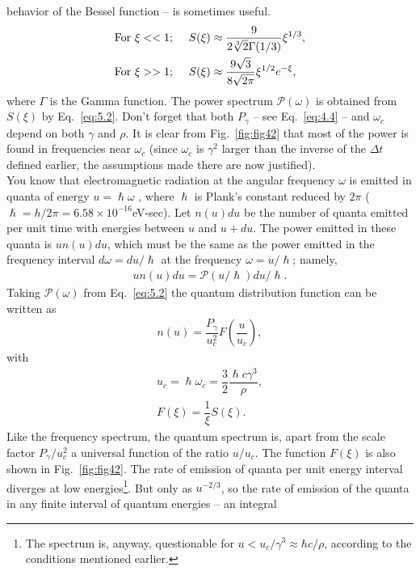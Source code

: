 behavior of the Bessel function -- is sometimes useful.
\begin{align} \label{eq:5.6}
	\text{For }\xi << 1; \hspace{5mm} & S(\xi) \approx \dfrac{9}{2\sqrt[3]{2}\Gamma(1/3)} \xi^{1/3}, \\
    \text{For }\xi >> 1; \hspace{5mm} & S(\xi) \approx \dfrac{9\sqrt{3}}{8 \sqrt{2\pi}} \xi^{1/2} e^{-\xi},
\end{align}
 where $\Gamma$ is the Gamma function. The power spectrum $\mathscr{P}(\omega)$ is obtained from $S(\xi)$ by Eq.~\eqref{eq:5.2}. Don't forget that both $P_\gamma$ -- see Eq.~\eqref{eq:4.4} -- and $\omega_c$ depend on both $\gamma$ and $\rho$. It is clear from Fig.~\ref{fig:fig42} that most of the power is found in frequencies near $\omega_c$ (since $\omega_c$ is $\gamma^2$ larger
 than the inverse of the $\Delta t$ defined earlier, the assumptions made there are now justified).\\
You know that electromagnetic radiation at the angular frequency $\omega$ is emitted in quanta of energy $u = \hslash \omega$ , where $\hslash$ is Plank's constant reduced by $2\pi$ ($\hslash = h/2\pi = 6.58 \times 10^{-16}$eV-sec). Let $n(u)du$ be the number of quanta emitted per unit time with energies between $u$ and $u + du$. The power emitted in these quanta is $un(u)du$,
which must be the same as the power emitted in the frequency interval $d\omega = du/\hslash$
at the frequency $\omega = u/\hslash$; namely,
\begin{align}
	u n(u) du = \mathscr{P}(u/\hslash)du/\hslash.
\end{align}
Taking $\mathscr{P}(\omega)$ from Eq.~\eqref{eq:5.2} the quantum distribution function can be written as
\begin{align}
	n(u) = \dfrac{P_\gamma}{u_c^2} F\left( \dfrac{u}{u_c} \right),
\end{align}
with
\begin{align} \label{eq:5.9}
	u_c = \hslash \omega_c = \dfrac{3}{2} \dfrac{\hslash c \gamma^3}{\rho},\\
    F(\xi) = \dfrac{1}{\xi}S(\xi).
\end{align}
Like the frequency spectrum, the quantum spectrum is, apart from the scale factor $P_\gamma/u_c^2$ a universal function of the ratio $u/u_c$.
The function $F(\xi)$ is also shown in Fig.~\ref{fig:fig42}. The rate of emission of quanta per unit energy interval diverges at low energies\footnote{The spectrum is, anyway, questionable for $u < u_c/\gamma^3 \approx \hbar c/\rho$, according to the conditions mentioned earlier.}. But only as $u^{-2/3}$, so the rate of emission of the quanta in any finite interval of quantum energies -- an integral
